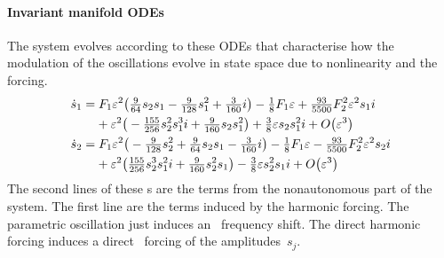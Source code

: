  
\paragraph{Invariant manifold ODEs} 
The system evolves according to these ODEs that characterise
how the modulation of the oscillations evolve in state space
due to nonlinearity and the forcing.
\begin{align*}&
\dot s_{1}=F_1 \varepsilon^{2} \big(\tfrac{9}{64} s_{2} s_{1}-\tfrac{9}{128} s_{1}^{2}+\tfrac{3}{160} i
\big)-\tfrac{1}{8} F_1 \varepsilon
+\tfrac{93}{5500} F_2^{2} \varepsilon^{2} s_{1} i
\\&\qquad{}
+\varepsilon^{2} \big(
-\tfrac{155}{256} s_{2}^{2} s_{1}^{3} i+\tfrac{9}{160} s_{2} s_{1}^{2}\big)
+\tfrac{3}{8} \varepsilon s
_{2} s_{1}^{2} i+O\big(\varepsilon ^{3}\big)
\\&
\dot s_{2}=F_1 \varepsilon^{2} \big(-\tfrac{9}{128} s_{2}^{2}+\tfrac{9}{64} s_{2} s_{1}-\tfrac{3}{160} i
\big)-\tfrac{1}{8} F_1 \varepsilon
-\tfrac{93}{5500} F_2^{2} \varepsilon^{2} s_{2} i
\\&\qquad{}
+\varepsilon^{2} \big(
\tfrac{155}{256} s_{2}^{3} s_{1}^{2} i+\tfrac{9}{160} s_{2}^{2} s_{1}\big)
-\tfrac{3}{8} \varepsilon s_
{2}^{2} s_{1} i+O\big(\varepsilon ^{3}\big)
\end{align*}
The second lines of these \ode{}s are the terms from the nonautonomous part of the system.   The first line are the terms induced by the harmonic forcing.  The parametric oscillation just induces an~ frequency shift.  The direct harmonic forcing induces a direct~ forcing of the amplitudes~\(s_j\).

